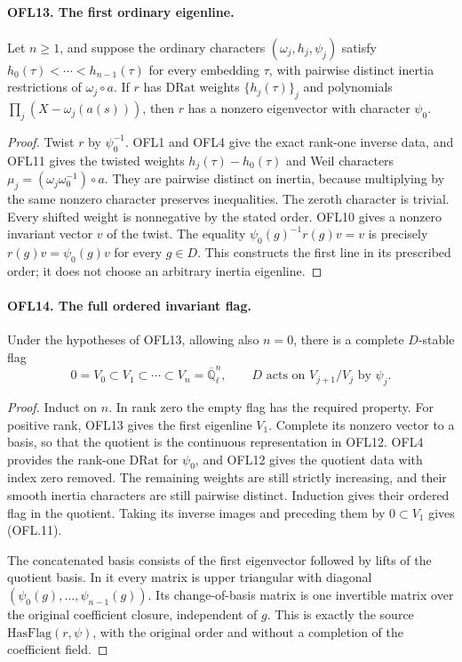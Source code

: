\documentclass[11pt,a4paper]{article}
\numberwithin{equation}{section}
\theoremstyle{remark}\newtheorem{remark}[theorem]{Remark}
\begin{document}
\paragraph{OFL13. The first ordinary eigenline.}
\label{claim:OFL13}
Let \(n\ge1\), and suppose the ordinary characters
\((\omega_j,h_j,\psi_j)\) satisfy
\(h_0(\tau)<\cdots<h_{n-1}(\tau)\) for every embedding
\(\tau\), with pairwise distinct inertia restrictions of
\(\omega_j\circ a\).  If \(r\) has \(\mathrm{DRat}\)
weights \(\{h_j(\tau)\}_j\) and polynomials
\(\prod_j(X-\omega_j(a(s)))\), then \(r\) has a nonzero
eigenvector with character \(\psi_0\).
\begin{proof}
Twist \(r\) by \(\psi_0^{-1}\).  OFL1 and OFL4 give
the exact rank-one inverse data, and OFL11 gives the twisted
weights \(h_j(\tau)-h_0(\tau)\) and Weil characters
\(\mu_j=(\omega_j\omega_0^{-1})\circ a\).
They are pairwise distinct on inertia, because multiplying by the
same nonzero character preserves inequalities.  The zeroth
character is trivial.  Every shifted weight is nonnegative by
the stated order.  OFL10 gives a nonzero invariant vector \(v\)
of the twist.  The equality
\(\psi_0(g)^{-1}r(g)v=v\) is precisely
\(r(g)v=\psi_0(g)v\) for every \(g\in D\).
This constructs the first line in its prescribed order; it does
not choose an arbitrary inertia eigenline.
\end{proof}

\paragraph{OFL14. The full ordered invariant flag.}
\label{claim:OFL14}
Under the hypotheses of OFL13, allowing also \(n=0\), there is
a complete \(D\)-stable flag
\[
 0=V_0\subset V_1\subset\cdots\subset V_n
             =\overline{\mathbb Q}_\ell^n,
 \qquad D\text{ acts on }V_{j+1}/V_j\text{ by }\psi_j.
 \tag{OFL.11}
\]
\begin{proof}
Induct on \(n\).  In rank zero the empty flag has the required
property.  For positive rank, OFL13 gives the first eigenline
\(V_1\).  Complete its nonzero vector to a basis, so that the
quotient is the continuous representation in OFL12.  OFL4 provides
the rank-one \(\mathrm{DRat}\) for \(\psi_0\), and OFL12
gives the quotient data with index zero removed.  The remaining
weights are still strictly increasing, and their smooth inertia
characters are still pairwise distinct.  Induction gives their
ordered flag in the quotient.  Taking its inverse images and
preceding them by \(0\subset V_1\) gives (OFL.11).

The concatenated basis consists of the first eigenvector followed
by lifts of the quotient basis.  In it every matrix is upper
triangular with diagonal
\((\psi_0(g),\ldots,\psi_{n-1}(g))\).  Its change-of-basis
matrix is one invertible matrix over the original coefficient
closure, independent of \(g\).  This is exactly the source
\(\mathrm{HasFlag}(r,\psi)\), with the original order and
without a completion of the coefficient field.
\end{proof}
\end{document}

